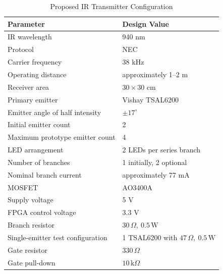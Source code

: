 \documentclass[a4paper,12pt]{article}
\begin{document}
\begin{table}[H]
    \centering
    \caption{Proposed IR Transmitter Configuration}
    \label{tab:design_summary}

    \begin{tabular}{@{}ll@{}}
        \toprule

        \textbf{Parameter} &
        \textbf{Design Value} \\

        \midrule

        IR wavelength &
        940 nm \\

        Protocol &
        NEC \\

        Carrier frequency &
        38 kHz \\

        Operating distance &
        approximately 1--2 m \\

        Receiver area &
        \(30 \times 30\) cm \\

        Primary emitter &
        Vishay TSAL6200 \\

        Emitter angle of half intensity &
        \(\pm17^\circ\) \\

        Initial emitter count &
        2 \\

        Maximum prototype emitter count &
        4 \\

        LED arrangement &
        2 LEDs per series branch \\

        Number of branches &
        1 initially, 2 optional \\

        Nominal branch current &
        approximately 77 mA \\

        MOSFET &
        AO3400A \\

        Supply voltage &
        5 V \\

        FPGA control voltage &
        3.3 V \\

        Branch resistor &
        \(30\,\Omega,\ 0.5\,\text{W}\) \\

        Single-emitter test configuration &
        1 TSAL6200 with \(47\,\Omega,\ 0.5\,\text{W}\) \\

        Gate resistor &
        \(330\,\Omega\) \\

        Gate pull-down &
        \(10\,\text{k}\Omega\) \\

        \bottomrule
    \end{tabular}

\end{table}
\end{document}
